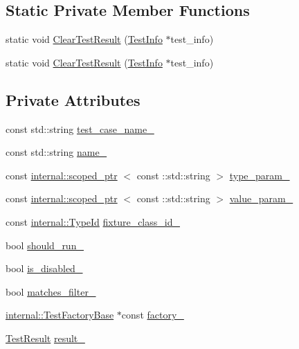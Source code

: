 \subsection*{\-Static \-Private \-Member \-Functions}
\begin{DoxyCompactItemize}
\item 
static void \hyperlink{classtesting_1_1TestInfo_a2230ddd76d3cfef898ecb4f8fb722f35}{\-Clear\-Test\-Result} (\hyperlink{classtesting_1_1TestInfo}{\-Test\-Info} $\ast$test\-\_\-info)
\item 
static void \hyperlink{classtesting_1_1TestInfo_a2230ddd76d3cfef898ecb4f8fb722f35}{\-Clear\-Test\-Result} (\hyperlink{classtesting_1_1TestInfo}{\-Test\-Info} $\ast$test\-\_\-info)
\end{DoxyCompactItemize}
\subsection*{\-Private \-Attributes}
\begin{DoxyCompactItemize}
\item 
const std\-::string \hyperlink{classtesting_1_1TestInfo_a01e1936a2c4b36dcf45ea5697f75a335}{test\-\_\-case\-\_\-name\-\_\-}
\item 
const std\-::string \hyperlink{classtesting_1_1TestInfo_a723d30392e2c4f36252de0528a1b246d}{name\-\_\-}
\item 
const \hyperlink{classtesting_1_1internal_1_1scoped__ptr}{internal\-::scoped\-\_\-ptr}\*
$<$ const \-::std\-::string $>$ \hyperlink{classtesting_1_1TestInfo_a85fc352afd22204cc3515cb59a7d5b38}{type\-\_\-param\-\_\-}
\item 
const \hyperlink{classtesting_1_1internal_1_1scoped__ptr}{internal\-::scoped\-\_\-ptr}\*
$<$ const \-::std\-::string $>$ \hyperlink{classtesting_1_1TestInfo_aee264753807b910c9144c99791622992}{value\-\_\-param\-\_\-}
\item 
const \hyperlink{namespacetesting_1_1internal_ac8e91f0c6a06c0361dc3152ddfeb2342}{internal\-::\-Type\-Id} \hyperlink{classtesting_1_1TestInfo_a6ab2218f8bfd984d35e06969ca95abc8}{fixture\-\_\-class\-\_\-id\-\_\-}
\item 
bool \hyperlink{classtesting_1_1TestInfo_ade0e3d581d82aaeaf7263d575564cb40}{should\-\_\-run\-\_\-}
\item 
bool \hyperlink{classtesting_1_1TestInfo_a461785b0a586f2fa2c146f1599293015}{is\-\_\-disabled\-\_\-}
\item 
bool \hyperlink{classtesting_1_1TestInfo_aff50a5d6360f8193a19682c01593b42b}{matches\-\_\-filter\-\_\-}
\item 
\hyperlink{classtesting_1_1internal_1_1TestFactoryBase}{internal\-::\-Test\-Factory\-Base} $\ast$const \hyperlink{classtesting_1_1TestInfo_a2025913d1ebb2135b3296dfbf0cf1875}{factory\-\_\-}
\item 
\hyperlink{classtesting_1_1TestResult}{\-Test\-Result} \hyperlink{classtesting_1_1TestInfo_afb2ec6cf0ab3f3e57bc2304e0df97c29}{result\-\_\-}
\end{DoxyCompactItemize}
